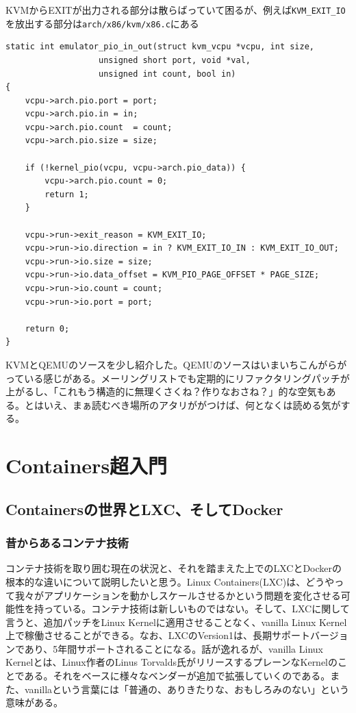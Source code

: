 ﻿\documentclass[9pt,b5paper,tombo,openany]{jsbook}
\begin{document}
KVMからEXITが出力される部分は散らばっていて困るが、例えば\verb|KVM_EXIT_IO|を放出する部分は\verb|arch/x86/kvm/x86.c|にある

\begin{lstlisting}
static int emulator_pio_in_out(struct kvm_vcpu *vcpu, int size,
                   unsigned short port, void *val,
                   unsigned int count, bool in)
{
    vcpu->arch.pio.port = port;
    vcpu->arch.pio.in = in;
    vcpu->arch.pio.count  = count;
    vcpu->arch.pio.size = size;

    if (!kernel_pio(vcpu, vcpu->arch.pio_data)) {
        vcpu->arch.pio.count = 0;
        return 1;
    }

    vcpu->run->exit_reason = KVM_EXIT_IO;
    vcpu->run->io.direction = in ? KVM_EXIT_IO_IN : KVM_EXIT_IO_OUT;
    vcpu->run->io.size = size;
    vcpu->run->io.data_offset = KVM_PIO_PAGE_OFFSET * PAGE_SIZE;
    vcpu->run->io.count = count;
    vcpu->run->io.port = port;

    return 0;
}
\end{lstlisting}

KVMとQEMUのソースを少し紹介した。QEMUのソースはいまいちこんがらがっている感じがある。メーリングリストでも定期的にリファクタリングパッチが上がるし、「これもう構造的に無理くさくね？作りなおさね？」的な空気もある。とはいえ、まぁ読むべき場所のアタリががつけば、何となくは読める気がする。

\chapter{Containers超入門}

\section{Containersの世界とLXC、そしてDocker}

\subsection{昔からあるコンテナ技術}
コンテナ技術を取り囲む現在の状況と、それを踏まえた上でのLXCとDockerの根本的な違いについて説明したいと思う。Linux Containers(LXC)は、どうやって我々がアプリケーションを動かしスケールさせるかという問題を変化させる可能性を持っている。コンテナ技術は新しいものではない。そして、LXCに関して言うと、追加パッチをLinux Kernelに適用させることなく、vanilla Linux Kernel上で稼働させることができる。なお、LXCのVersion1は、長期サポートバージョンであり、5年間サポートされることになる。話が逸れるが、vanilla Linux Kernelとは、Linux作者のLinus Torvalds氏がリリースするプレーンなKernelのことである。それをベースに様々なベンダーが追加で拡張していくのである。また、vanillaという言葉には「普通の、ありきたりな、おもしろみのない」という意味がある。
\end{document}
